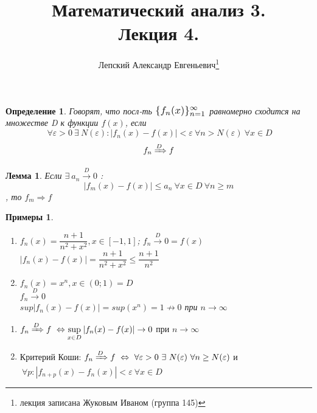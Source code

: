 \documentclass[a4paper, 12pt]{article}
\title{\vspace{-2.0cm}Математический анализ 3.\\Лекция 4.}
\author{Лепский Александр Евгеньевич\footnote{лекция записана Жуковым Иваном (группа 145)}}
\newtheorem{Definition}{Определение}
\newtheorem{Lemma}{Лемма}
\newtheorem{Examples}{Примеры}
\begin{document}
    \maketitle
    
    \begin{Definition}
        Говорят, что посл-ть $\scalebox{1.2}{$\{f_n(x)\}^{\infty}_{n = 1}$}$ равномерно сходится
        на множестве D к функции $f(x)$, если\\
        \[\ \forall \varepsilon > 0
        \ \exists \  N(\varepsilon): \left| f_n(x) - f(x) \right|
        < \varepsilon \ \forall n > N(\varepsilon) \ \forall x \in D\]         
        \[f_n \xRightarrow{D} f\]
    \end{Definition}

    \begin{Lemma}
        Если $\exists \ a_n \xrightarrow{D} 0$ :
        \[ \left| f_m(x) - f(x)\right| \le a_n \ \forall x \in D \ \forall n
        \ge m\], то $f_m \Rightarrow f$
    \end{Lemma}

    \begin{Examples}
        \leavevmode
        \begin{enumerate}
            \item
            $f_n(x) = \dfrac{n + 1}{n^2 + x^2}, x \in [-1, 1]$;
            $f_n \xrightarrow{D} 0 = f(x)$\\
            $\left| f_n(x) - f(x)\right| = \dfrac{n + 1}{n^2 + x^2} \le
            \dfrac{n + 1}{n^2}$

            \item
            $f_n(x) = x^n, x \in (0; 1) = D$ \\
            $f_n \xrightarrow{D} 0$ \\
            $sup \left| f_n(x) - f(x) \right| = sup(x^n) = 1 \not \rightarrow 0$
            при $n \rightarrow \infty$

        \end{enumerate}
    \end{Examples}

    \begin{enumerate}
        \item 
        $f_n \xRightarrow{D} f \ \Leftrightarrow \underset{x \in D}{\sup}
        \left| f_n(x) - f(x)\right| \rightarrow 0$  при $n \rightarrow \infty$

        \item
        Критерий Коши:
        $f_n \xRightarrow{D} f \ \Leftrightarrow \ \forall \varepsilon > 0
        \ \exists \ N(\varepsilon) \ \forall n \ge N(\varepsilon)$ и\\
        $\ \forall p: \left| f_{n + p}(x) - f_n(x) \right| <
        \varepsilon \ \forall x \in D$ 
    \end{enumerate}
\end{document}
